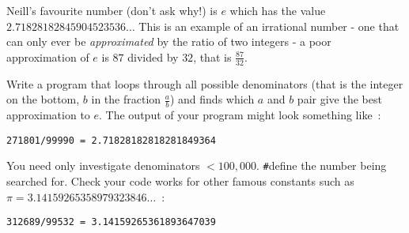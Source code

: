 
Neill's favourite number (don't ask why!) is $e$ which has the value
$2.71828182845904523536\ldots$ This is an example of an irrational
number - one that can only ever be {\it approximated} by the ratio
of two integers - a poor approximation of $e$ is $87$ divided by $32$,
that is $\frac{87}{32}$.

\begin{exercise}
Write a program that loops through all possible denominators (that is
the integer on the bottom, $b$ in the fraction $\frac{a}{b}$) and finds
which $a$ and $b$ pair give the best approximation to $e$.
The output of your program might look something like~:

\begin{verbatim}
271801/99990 = 2.71828182818281849364
\end{verbatim}

\noindent You need only investigate denominators $< 100,000$.
\verb^#^define the number being searched for.
Check your code works
for other famous constants such as $\pi = 3.14159265358979323846\ldots$~:

\begin{verbatim}
312689/99532 = 3.14159265361893647039
\end{verbatim}
\end{exercise}
